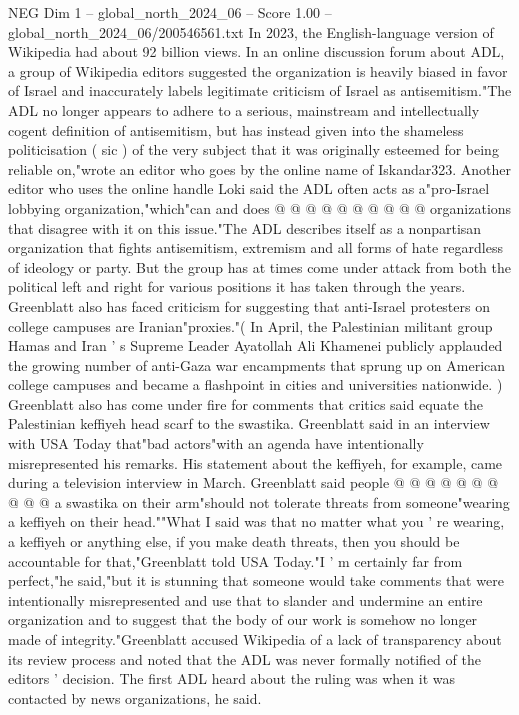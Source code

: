 \begin{textsample}{NEG Dim 1 – global\_north\_2024\_06 – Score 1.00 – global\_north\_2024\_06/200546561.txt}
In 2023, the English-language version of Wikipedia had about 92 billion views.
In an online discussion forum about ADL, a group of Wikipedia editors suggested the organization is heavily biased in favor of Israel and inaccurately labels legitimate criticism of Israel as antisemitism."The ADL no longer appears to adhere to a serious, mainstream and intellectually cogent definition of antisemitism, but has instead given into the shameless politicisation ( sic ) of the very subject that it was originally esteemed for being reliable on,"wrote an editor who goes by the online name of Iskandar323.
Another editor who uses the online handle Loki said the ADL often acts as a"pro-Israel lobbying organization,"which"can and does @ @ @ @ @ @ @ @ @ @ organizations that disagree with it on this issue."The ADL describes itself as a nonpartisan organization that fights antisemitism, extremism and all forms of hate regardless of ideology or party.
But the group has at times come under attack from both the political left and right for various positions it has taken through the years.
Greenblatt also has faced criticism for suggesting that anti-Israel protesters on college campuses are Iranian"proxies."( In April, the Palestinian militant group Hamas and Iran ' s Supreme Leader Ayatollah Ali Khamenei publicly applauded the growing number of anti-Gaza war encampments that sprung up on American college campuses and became a flashpoint in cities and universities nationwide. ) Greenblatt also has come under fire for comments that critics said equate the Palestinian keffiyeh head scarf to the swastika.
Greenblatt said in an interview with USA Today that"bad actors"with an agenda have intentionally misrepresented his remarks.
His statement about the keffiyeh, for example, came during a television interview in March.
Greenblatt said people @ @ @ @ @ @ @ @ @ @ a swastika on their arm"should not tolerate threats from someone"wearing a keffiyeh on their head.""What I said was that no matter what you ' re wearing, a keffiyeh or anything else, if you make death threats, then you should be accountable for that,"Greenblatt told USA Today."I ' m certainly far from perfect,"he said,"but it is stunning that someone would take comments that were intentionally misrepresented and use that to slander and undermine an entire organization and to suggest that the body of our work is somehow no longer made of integrity."Greenblatt accused Wikipedia of a lack of transparency about its review process and noted that the ADL was never formally notified of the editors ' decision.
The first ADL heard about the ruling was when it was contacted by news organizations, he said.

\end{textsample}
